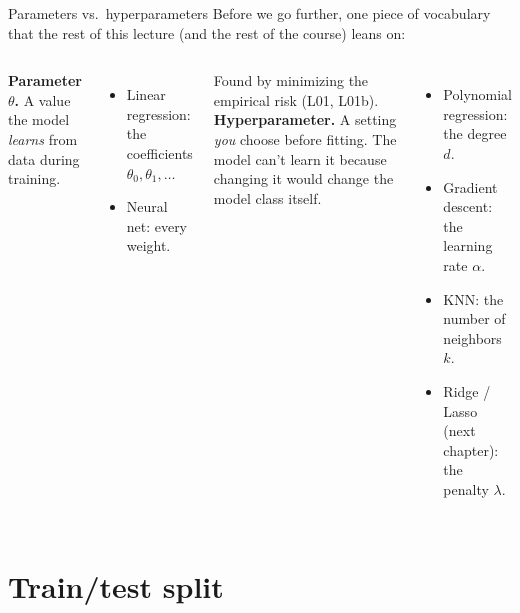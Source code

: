 \documentclass[aspectratio=169]{beamer}
\begin{document}
\begin{frame}{Parameters vs.\ hyperparameters}
  Before we go further, one piece of vocabulary that the rest of this lecture (and the rest of the course) leans on:
  \vfill
  \begin{columns}[T]
    \textbf{Parameter $\theta$.} A value the model \emph{learns} from data during training.
    \begin{itemize}\small
      \item Linear regression: the coefficients $\theta_0, \theta_1, \ldots$
      \item Neural net: every weight.
    \end{itemize}
    Found by minimizing the empirical risk (L01, L01b).
    \textbf{Hyperparameter.} A setting \emph{you} choose before fitting. The model can't learn it because changing it would change the model class itself.
    \begin{itemize}\small
      \item Polynomial regression: the degree $d$.
      \item Gradient descent: the learning rate $\alpha$.
      \item KNN: the number of neighbors $k$.
      \item Ridge / Lasso (next chapter): the penalty $\lambda$.
    \end{itemize}
  \end{columns}
  \vfill
\end{frame}

\section{Train/test split}
\end{document}
